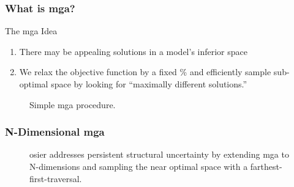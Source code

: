 \begin{frame}
    \frametitle{What is \gls{mga}?}
    \begin{block}{The \gls{mga} Idea}
    
         \begin{enumerate}
            \item There may be appealing solutions in a model's inferior space
            \item We relax the objective function by a fixed \% and efficiently sample
            sub-optimal space by looking for ``maximally different solutions.''
         \end{enumerate}    
    \end{block}
        \begin{figure}
            \centering
            \resizebox{!}{0.6\textheight}{}
            \caption{Simple \gls{mga} procedure.}
        \end{figure}
\end{frame}

\begin{frame}
    \frametitle{N-Dimensional \gls{mga}}
    \begin{figure}
        \centering
        \resizebox{\columnwidth}{!}{}
        \caption{\gls{osier} addresses persistent structural uncertainty by extending \gls{mga} to N-dimensions and sampling the near optimal
        space with a farthest-first-traversal.}
    \end{figure}
\end{frame}

